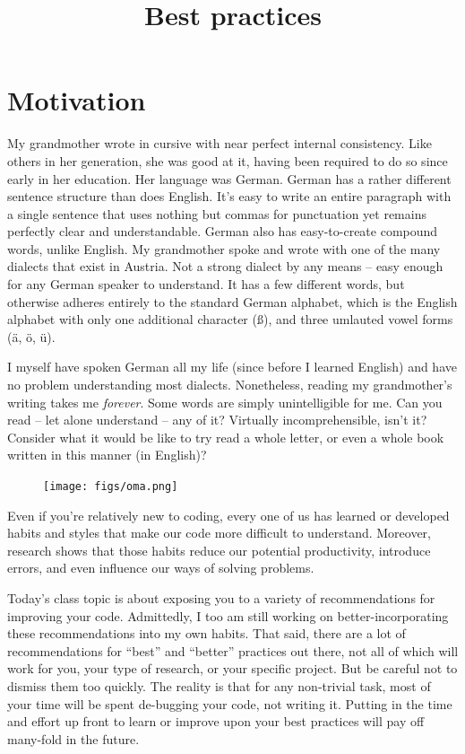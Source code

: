 \documentclass[12pt,letterpaper]{article}
\author{}
\title{Best practices}
\begin{document}
\maketitle
\date{}

\tableofcontents

\pagebreak

\section{Motivation}

My grandmother wrote in cursive with near perfect internal consistency.
Like others in her generation, she was good at it, having been required to do so since early in her education.
Her language was German.
German has a rather different sentence structure than does English.
It's easy to write an entire paragraph with a single sentence that uses nothing but commas for punctuation yet remains perfectly clear and understandable.
German also has easy-to-create compound words, unlike English.
My grandmother spoke and wrote with one of the many dialects that exist in Austria.
Not a strong dialect by any means -- easy enough for any German speaker to understand.
It has a few different words, but otherwise adheres entirely to the standard German alphabet, which is the English alphabet with only one additional character ({\ss}), and three umlauted vowel forms (\"{a}, \"{o}, \"{u}).

I myself have spoken German all my life (since before I learned English) and have no problem understanding most dialects.
Nonetheless, reading my grandmother's writing takes me \emph{forever}.
Some words are simply unintelligible for me.
Can you read -- let alone understand -- any of it?
Virtually incomprehensible, isn't it?
Consider what it would be like to try read a whole letter, or even a whole book written in this manner (in English)?

\begin{figure}[h]
	\centering
	\texttt{[image: figs/oma.png]}
\end{figure}

Even if you're relatively new to coding, every one of us has learned or developed habits and styles that make our code more difficult to understand.
Moreover, research shows that those habits reduce our potential productivity, introduce errors, and even influence our ways of solving problems.

Today's class topic is about exposing you to a variety of recommendations for improving your code.
Admittedly, I too am still working on better-incorporating these recommendations into my own habits.
That said, there are a lot of recommendations for ``best'' and ``better'' practices out there, not all of which will work for you, your type of research, or your specific project.
But be careful not to dismiss them too quickly.
The reality is that for any non-trivial task, most of your time will be spent de-bugging your code, not writing it.
Putting in the time and effort up front to learn or improve upon your best practices will pay off many-fold in the future.
\end{document}
